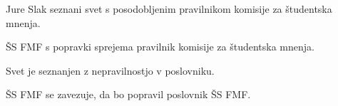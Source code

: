 \documentclass{seja}
\begin{document}
\begin{ad}
\item Jure Slak seznani svet s posodobljenim pravilnikom komisije za študentska mnenja.

\begin{sklep*}
ŠS FMF s popravki sprejema pravilnik komisije za študentska mnenja.
\end{sklep*}

\item Svet je seznanjen z nepravilnostjo v poslovniku.

\begin{sklep*}
ŠS FMF se zavezuje, da bo popravil poslovnik ŠS FMF.
\end{sklep*}
\end{ad}

\makeatletter \global\let\@enddocumenthook\@empty \makeatother
{}
\end{document}
